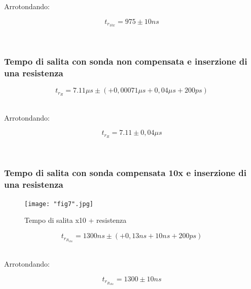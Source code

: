 \documentclass[a4paper]{article}
\begin{document}
Arrotondando: 

\begin{Large}
	\begin{equation}
		{t_{r_{10x}}}= 975\pm 10 ns
	\end{equation}
\end{Large}\\

\subsubsection{Tempo di salita con sonda non compensata e inserzione di una resistenza}

\begin{Large}
	\begin{equation}
		t_{r_R}= 7.11\mu s \pm( + 0,00071\mu s + 0,04\mu s + 200ps)
	\end{equation}
\end{Large}\\

Arrotondando: 

\begin{Large}
	\begin{equation}
		t_{r_R}= 7.11\pm 0,04 \mu s
	\end{equation}
\end{Large}\\

\subsubsection{Tempo di salita con sonda compensata 10x e inserzione di una resistenza}
\begin{figure}[htp]
	\centering
	\texttt{[image: "fig7".jpg]}
	\caption{Tempo di salita x10 + resistenza }
	\label{}
\end{figure}
\begin{Large}
	\begin{equation}
		{t_{r_{R_{10x}}}}= 1300ns \pm ( + 0,13ns + 10ns + 200ps)
	\end{equation}
\end{Large}\\

Arrotondando: 

\begin{Large}
	\begin{equation}
		{t_{r_{R_{10x}}}}= 1300\pm 10 ns
	\end{equation}
\end{Large}\\
\end{document}
